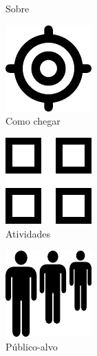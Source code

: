 \documentclass[
  letterpaper,
  DIV=11,
  numbers=noendperiod,
  oneside]{scrreprt}
\begin{document}
\begin{figure}
\begin{figure}[H]
{}

\caption{Sobre}

\end{figure}%

\begin{figure}[H]

{\centering \includegraphics{index_files/mediabag/localizacao/localizacao.pdf}

}

\caption{Como chegar}

\end{figure}%

\begin{figure}[H]

{\centering \includegraphics{index_files/mediabag/atividades/atividades.pdf}

}

\caption{Atividades}

\end{figure}%

\begin{figure}[H]

{\centering \includegraphics{index_files/mediabag/publico-alvo/publico-alvo.pdf}

}

\caption{Público-alvo}

\end{figure}%

\begin{figure}[H]


\end{figure}
\end{figure}
\end{document}

